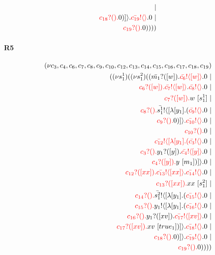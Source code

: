 \documentclass{article}
\begin{document}
\begin{align*}
| \\ \color{red}c_{18}?().\color{black}0 )] \rangle \color{black}.\color{red}\bar{c_{19}}! \langle  \rangle \color{black}.0  \ | \\ \color{red}c_{19}?().\color{black}0 ))))
\end{align*}
\paragraph{R5}
\begin{align*}
 (\nu c_{3},c_{4},c_{6},c_{7},c_{8},c_{9},c_{10},c_{12},c_{13},c_{14},c_{15},c_{16},c_{17},c_{18},c_{19}) \\ ( (\nu s^{1}_{1})( (\nu s^{2}_{1})((\color{black}\bar{m_{1}}?([w]).\color{black}\color{red}\bar{c_{6}}! \langle [w] \rangle \color{black}.0  \ | \\ \color{red}c_{6}?([w]).\color{black}\color{red}\bar{c_{7}}! \langle [w] \rangle \color{black}.\color{red}\bar{c_{8}}! \langle  \rangle \color{black}.0  \ | \\ \color{red}c_{7}?([w]).\color{black}w \ [s^{1}_{1}] \ | \\ \color{red}c_{8}?().\color{black}\color{black}\bar{s^{1}_{1}}! \langle [ \lambda [y_{1}].(\color{red}\bar{c_{9}}! \langle  \rangle \color{black}.0  \ | \\ \color{red}c_{9}?().\color{black}0 )] \rangle \color{black}.\color{red}\bar{c_{10}}! \langle  \rangle \color{black}.0  \ | \\ \color{red}c_{10}?().\color{black}0  \ | \\ \color{red}\bar{c_{12}}! \langle [ \lambda [y_{1}].(\color{red}\bar{c_{3}}! \langle  \rangle \color{black}.0  \ | \\ \color{red}c_{3}?().\color{black}\color{black}y_{1}?([y]).\color{black}\color{red}\bar{c_{4}}! \langle [y] \rangle \color{black}.0  \ | \\ \color{red}c_{4}?([y]).\color{black}y \ [m_{1}])] \rangle \color{black}.0  \ | \\ \color{red}c_{12}?([xx]).\color{black}\color{red}\bar{c_{13}}! \langle [xx] \rangle \color{black}.\color{red}\bar{c_{14}}! \langle  \rangle \color{black}.0  \ | \\ \color{red}c_{13}?([xx]).\color{black}xx \ [s^{2}_{1}] \ | \\ \color{red}c_{14}?().\color{black}\color{black}\bar{s^{2}_{1}}! \langle [ \lambda [y_{1}].(\color{red}\bar{c_{15}}! \langle  \rangle \color{black}.0  \ | \\ \color{red}c_{15}?().\color{black}\color{black}y_{1}! \langle [ \lambda [y_{1}].(\color{red}\bar{c_{16}}! \langle  \rangle \color{black}.0  \ | \\ \color{red}c_{16}?().\color{black}\color{black}y_{1}?([xv]).\color{black}\color{red}\bar{c_{17}}! \langle [xv] \rangle \color{black}.0  \ | \\ \color{red}c_{17}?([xv]).\color{black}xv \ [true_{1}])] \rangle \color{black}.\color{red}\bar{c_{18}}! \langle  \rangle \color{black}.0  \ | \\ \color{red}c_{18}?().\color{black}0 )] \rangle \color{black}.\color{red}\bar{c_{19}}! \langle  \rangle \color{black}.0  \ | \\ \color{red}c_{19}?().\color{black}0 ))))

\end{align*}
\end{document}
